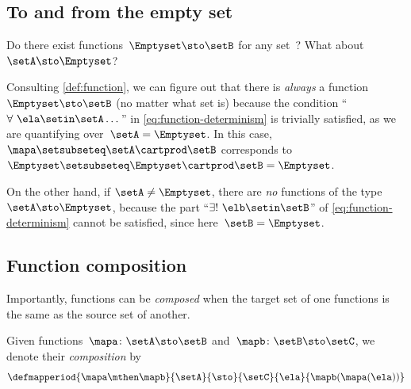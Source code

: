\subsection{To and from the empty set}

Do there exist functions~$\Emptyset \sto \setB$ for any set~\setB?
What about~$\setA \sto \Emptyset$?

Consulting \cref{def:function}, we can figure out that there is \emph{always} a function $\Emptyset \sto \setB$ (no matter what set \setB is) because the condition ``$\forall \ \ela \setin\setA \dots$'' in \cref{eq:function-determinism} is trivially satisfied, as we are quantifying over~$\setA = \Emptyset$.
In this case,~$\mapa \setsubseteq \setA \cartprod \setB$ corresponds to~$\Emptyset \setsubseteq \Emptyset \cartprod \setB = \Emptyset$.

On the other hand, if $\setA \neq \Emptyset$, there are \emph{no} functions of the type~$\setA \sto \Emptyset$, because the part ``$\exists ! \ \elb \setin\setB$'' of \cref{eq:function-determinism} cannot be satisfied, since here~$\setB = \Emptyset$.



\subsection{Function composition}

\begin{marginfigure}
    \centering
    \caption{Two functions with corresponding target and source sets.}
    \label{fig:function_comp_figure}
\end{marginfigure}

\begin{marginfigure}
    \centering
    \caption{The  of two functions.}
    \label{fig:function_comp_figure_b}
\end{marginfigure}

Importantly, functions can be \emph{composed} when the target set of one functions is the same as the source set of another.
\begin{ctdefinition}
    \label{def:composition-of-functions}
    Given functions~$\mapa\colon \setA \sto \setB$ and~$\mapb \colon \setB \sto \setC$, we denote their \emph{composition} by
    \begin{equation}
        \label{eq:composition-notation-functions}
        \defmapperiod{
            \mapa \mthen \mapb
        }{
            \setA
        }{
            \sto
        }{
            \setC
        }{
            \ela
        }{
            \mapb(\mapa(\ela))
        }
    \end{equation}
\end{ctdefinition}

